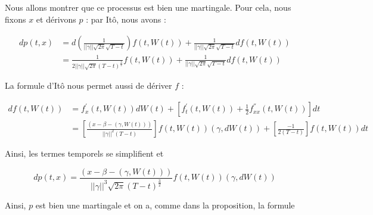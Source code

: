 \documentclass[../finalreport.tex]{subfiles}
\begin{document}
\par Nous allons montrer que ce processus est bien une martingale. Pour cela, nous fixons $x$ et dérivons $p$ : par Itô, nous avons :

\begin{displaymath}
	\begin{split}
	dp \left( t, x \right) &= d \left( \frac{1}{ ||\gamma|| \sqrt{2 \pi} \sqrt{T - t}} \right) f \left( t, W \left( t \right) \right) + \frac{1}{ ||\gamma|| \sqrt{2 \pi} \sqrt{T - t}} d f \left( t, W \left( t \right) \right) \\
	&= \frac{1}{2  ||\gamma|| \sqrt{2 \pi} \left( T - t \right)^{\frac{3}{2}}} f \left( t, W \left( t \right) \right) + \frac{1}{ ||\gamma|| \sqrt{2 \pi} \sqrt{T - t}} d f \left( t, W \left( t \right) \right)
	\end{split}
\end{displaymath}

\par La formule d'Itô nous permet aussi de dériver $f$ : 

\begin{displaymath}
	\begin{split}
	df \left( t, W \left( t \right) \right) &= f_{x}^{'} \left( t, W \left( t \right) \right) d W \left( t \right) + \left[ f_{t}^{'} \left( t, W \left( t \right) \right) + \frac{1}{2} f_{xx}^{''} \left( t, W \left( t \right) \right) \right] dt \\
	&=  \left[ \frac{\left( x - \beta - \left( \gamma, W \left( t \right) \right)\right)}{||\gamma||^2 \left( T - t \right)} \right] f \left( t, W \left( t \right) \right) \left( \gamma, d W \left( t \right) \right) + \left[ \frac{-1}{2 \left( T - t \right)} \right]f \left( t, W \left( t \right) \right) dt
	\end{split}
\end{displaymath}

\par Ainsi, les termes temporels se simplifient et 

\begin{displaymath}
dp \left( t, x \right) = \frac{\left( x - \beta - \left( \gamma, W \left( t \right) \right) \right)}{||\gamma||^3 \sqrt{2 \pi} \left( T - t \right)^{\frac{3}{2}}} f \left( t, W \left( t \right) \right) \left( \gamma, d W \left( t \right) \right)
\end{displaymath}

\par Ainsi, $p$ est bien une martingale et on a, comme dans la proposition, la formule 
\end{document}
